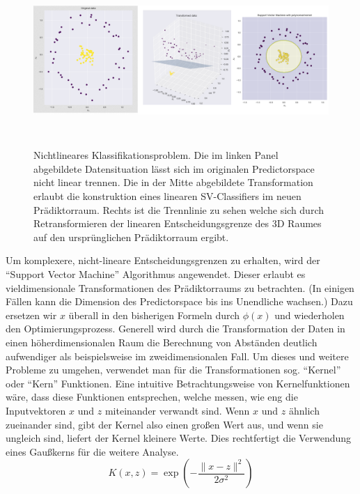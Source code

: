 \begin{figure}[H]
    \centering
    \includegraphics[width = 15cm, height = 6.5cm]{Figures/kerneltrick.png}
    \caption{Nichtlineares Klassifikationsproblem. Die im linken Panel abgebildete Datensituation lässt sich im originalen Predictorspace nicht linear trennen. Die in der Mitte abgebildete Transformation erlaubt die konstruktion eines linearen SV-Classifiers im neuen Prädiktorraum. Rechts ist die Trennlinie zu sehen welche sich durch Retransformieren der linearen Entscheidungsgrenze des 3D Raumes auf den ursprünglichen Prädiktorraum ergibt. \cite{kernelintuition} }
    \label{kerneltrick}
\end{figure}
Um komplexere, nicht-lineare Entscheidungsgrenzen zu erhalten, wird der ``Support Vector Machine'' Algorithmus angewendet. Dieser erlaubt es vieldimensionale Transformationen des Prädiktorraums zu betrachten. (In einigen Fällen kann die Dimension des Predictorspace bis ins Unendliche wachsen.) Dazu ersetzen wir $x$ überall in den bisherigen Formeln durch $\phi(x)$ und wiederholen den Optimierungsprozess. \cite{kernelintuition} Generell wird durch die Transformation der Daten in einen höherdimensionalen Raum die Berechnung von Abständen deutlich aufwendiger als beispielsweise im zweidimensionalen Fall. Um dieses und weitere Probleme zu umgehen, verwendet man für die Transformationen sog. ``Kernel'' oder ``Kern'' Funktionen. Eine intuitive Betrachtungsweise von Kernelfunktionen wäre, dass diese Funktionen entsprechen, welche messen, wie eng die Inputvektoren $x$ und $z$ miteinander verwandt sind. Wenn $x$ und $z$ ähnlich zueinander sind, gibt der Kernel also einen großen Wert aus, und wenn sie ungleich sind, liefert der Kernel kleinere Werte. Dies rechtfertigt die Verwendung eines Gaußkerns für die weitere Analyse. \\
\begin{equation}
    \label{gausskern}
    K(x, z)=\exp \left(-\frac{\|x-z\|^{2}}{2 \sigma^{2}}\right)
\end{equation}
